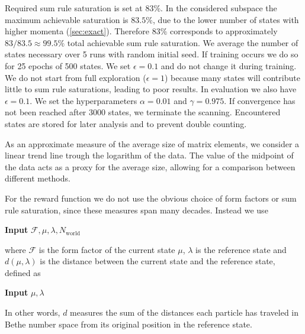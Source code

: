 \documentclass[11pt, a4paper]{report} %
\begin{document}
Required sum rule saturation is set at 83\%.
In the considered subspace the maximum achievable saturation is \(83.5\%\), due to the lower number of states with higher momenta (\cref{sec:exact}). 
Therefore \(83\%\) corresponds to approximately \(83/83.5\approx99.5\%\) total achievable sum rule saturation.
We average the number of states necessary over 5 runs with random initial seed.
If training occurs we do so for 25 epochs of 500 states.
We set \(\epsilon=0.1\) and do not change it during training.
We do not start from full exploration (\(\epsilon=1\)) because many states will contribute little to sum rule saturations, leading to poor results.
In evaluation we also have \(\epsilon=0.1\).
We set the hyperparameters \(\alpha=0.01\) and \(\gamma = 0.975\).
If convergence has not been reached after 3000 states, we terminate the scanning.
Encountered states are stored for later analysis and to prevent double counting.

As an approximate measure of the average size of matrix elements, we consider a linear trend line trough the logarithm of the  data.
The value of the midpoint of the data acts as a proxy for the average size, allowing for a comparison between different methods.

For the reward function we do not use the obvious choice of form factors or sum rule saturation, since these measures span many decades.
Instead we use
\begin{algorithm}[H]
   \hspace*{\algorithmicindent} \textbf{Input} $\mathcal{F}, \mu, \lambda, N_{\mathrm{world}}$ 
   \begin{algorithmic}[1]
     \Else{}
     \EndIf{}
  \end{algorithmic}
\end{algorithm}
\noindent
where \(\mathcal{F}\) is the form factor of the current state \(\mu\), \(\lambda\) is the reference state and \(d(\mu, \lambda)\) is the distance between the current state and the reference state, defined as
\begin{algorithm}[H]
   \hspace*{\algorithmicindent} \textbf{Input} $\mu, \lambda$ 
   \begin{algorithmic}[1]
     \vspace{3mm}
     \EndFor{}
  \end{algorithmic}
\end{algorithm}
\noindent
In other words, \(d\) measures the sum of the distances each particle has traveled in Bethe number space from its original position in the reference state.
\end{document}
